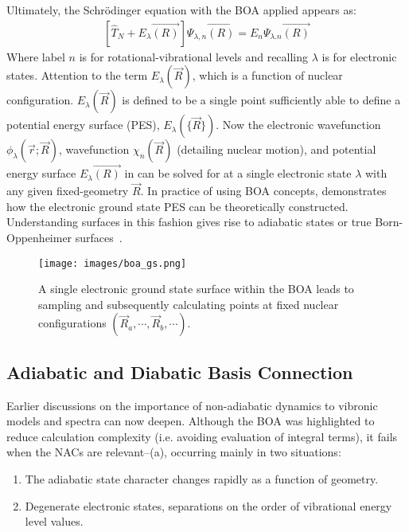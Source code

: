 Ultimately, the Schrödinger equation with the BOA applied appears as:
\begin{equation}\label{eq:10}
    \begin{split} 
            \left[ \hat{T}_N + E_{\lambda} \Vec{(R)} \right] \Psi_{\lambda, n} \Vec{(R)} = E_{n} \Psi_{\lambda. n} \Vec{(R)}
    \end{split}
\end{equation}
Where label $n$ is for rotational-vibrational levels and recalling $\lambda$ is for electronic states. Attention to the term $E_{\lambda}(\Vec{R})$, which is a function of nuclear configuration. %
$E_{\lambda}(\Vec{R})$ is defined to be a single point sufficiently able to define a potential energy surface (PES), $E_{\lambda}(\{ \Vec{R} \})$. Now the electronic wavefunction $\phi_{\lambda} (\Vec{r};\Vec{R})$, wavefunction $\chi_{n} (\Vec{R})$ (detailing nuclear motion), and potential energy surface $E_{\lambda} \Vec{(R)}$ in  can be solved for  at a single electronic state $\lambda$ with any given fixed-geometry $\Vec{R}$. In practice of using BOA concepts,  demonstrates how the electronic ground state PES can be theoretically constructed. Understanding surfaces in this fashion gives rise to adiabatic states or true Born-Oppenheimer surfaces~\cite{villanueva2020spectroscopic}. 
\\
\begin{figure}[!h]
    \center
    \texttt{[image: images/boa\_gs.png]}
    \caption[Depiction of a BOA Electronic Ground State Surface ]{\label{fig:fig1} A single electronic ground state surface within the BOA leads to sampling and subsequently calculating points at fixed nuclear configurations $(\Vec{R}_a, \cdots, \Vec{R}_b, \cdots)$.}
\end{figure}

\newpage
\subsection{Adiabatic and Diabatic Basis Connection}
Earlier discussions on the importance of non-adiabatic dynamics to vibronic models and spectra can now deepen. Although the BOA was highlighted to reduce calculation complexity (i.e. avoiding evaluation of integral terms), it fails when the NACs are relevant--(a), occurring mainly in two situations:
\begin{enumerate}[label=\roman*.]
    \item The adiabatic state character changes rapidly as a function of geometry.
    \item Degenerate electronic states, separations on the order of vibrational energy level values.
\end{enumerate}

